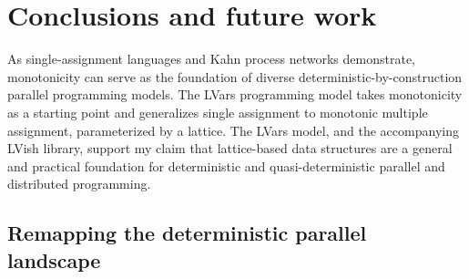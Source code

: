 \chapter{Conclusions and future work}\label{ch:conclusion} %

As single-assignment languages and Kahn process networks demonstrate,
monotonicity can serve as the foundation of diverse
deterministic-by-construction parallel programming models.  The LVars
programming model takes monotonicity as a starting point and
generalizes single assignment to monotonic multiple assignment,
parameterized by a lattice.  The LVars model, and the accompanying
LVish library, support my claim that lattice-based data structures are
a general and practical foundation for deterministic and
quasi-deterministic parallel and distributed programming.

\section{Remapping the deterministic parallel landscape}

